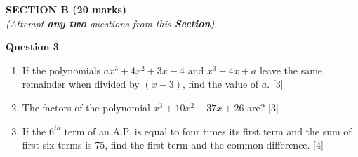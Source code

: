 \newpage
\begin{center}
   \large
   \textbf{SECTION B (20 marks)}\\
   \vspace{5mm}
   \normalsize
   \textit{(Attempt \textbf{any two} questions from this \textbf{Section})}
\end{center}
\par

\noindent
\textbf{Question 3}
\begin{enumerate}[label=(\roman*)]

    \item If the polynomials $ax^3 + 4x^2 + 3x - 4$ and 
        $x^3 - 4x + a$ leave the same remainder when divided by 
        $(x-3)$, find the value of $a$. \hfill [3]

    \item The factors of the polynomial $x^3 + 10x^2 - 37x + 26$ are? \hfill [3]

    \item If the $6^{th}$ term of an A.P. is equal to four times its
        first term and the sum of first six terms is 75, find the 
        first term and the common difference. \hfill [4]

\end{enumerate}

